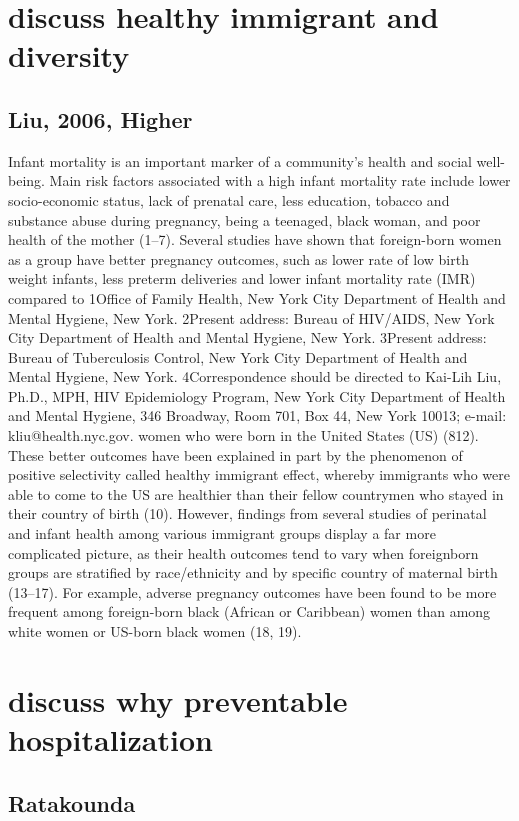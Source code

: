 \documentclass[../main.tex]{subfiles}
\begin{document}
\section{discuss healthy immigrant and diversity}
\subsection{Liu, 2006, Higher}
Infant mortality is an important marker of a community’s health and social well-being. Main risk factors associated with a high infant mortality rate include lower socio-economic status, lack of prenatal care, less education, tobacco and substance abuse during pregnancy, being a teenaged, black woman, and poor health of the mother (1–7). Several studies have shown that foreign-born women as a group have better pregnancy outcomes, such as lower rate of low birth weight infants, less preterm deliveries and lower infant mortality rate (IMR) compared to 1Office of Family Health, New York City Department of Health and Mental Hygiene, New York. 2Present address: Bureau of HIV/AIDS, New York City Department of Health and Mental Hygiene, New York. 3Present address: Bureau of Tuberculosis Control, New York City Department of Health and Mental Hygiene, New York. 4Correspondence should be directed to Kai-Lih Liu, Ph.D., MPH, HIV Epidemiology Program, New York City Department of Health and Mental Hygiene, 346 Broadway, Room 701, Box 44, New York 10013; e-mail: kliu@health.nyc.gov. women who were born in the United States (US) (812). These better outcomes have been explained in part by the phenomenon of positive selectivity called healthy immigrant effect, whereby immigrants who were able to come to the US are healthier than their fellow countrymen who stayed in their country of birth (10). However, findings from several studies of perinatal and infant health among various immigrant groups display a far more complicated picture, as their health outcomes tend to vary when foreignborn groups are stratified by race/ethnicity and by specific country of maternal birth (13–17). For example, adverse pregnancy outcomes have been found to be more frequent among foreign-born black (African or Caribbean) women than among white women or US-born black women (18, 19).

\section{discuss why preventable hospitalization}

\subsection{Ratakounda}
\end{document}
